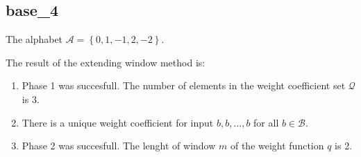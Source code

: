\subsection{ base\_4 }

\label{subsec:base4}

The alphabet $\mathcal{A} =\left\{0, 1, -1, 2, -2\right\}$.

\noindent The result of the extending window method is:
\begin{enumerate}
    \item Phase 1 was succesfull.
The number of elements in the weight coefficient set $\mathcal{Q}$ is $3$.

    \item There is a unique weight coefficient for input $b,b,\dots,b$ for all $b\in\mathcal{B}$.

    \item Phase 2 was succesfull.
The lenght of window $m$ of the weight function $q$ is 2.
\end{enumerate}
